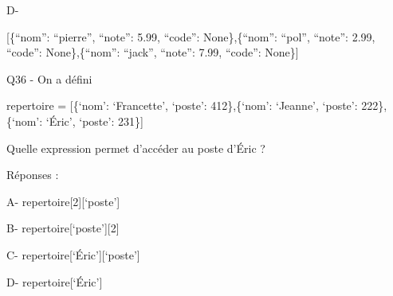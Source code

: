 \documentclass[
]{book}
\begin{document}
D-

{[}\{``nom'': ``pierre'', ``note'': 5.99, ``code'': None\},\{``nom'': ``pol'', ``note'': 2.99, ``code'': None\},\{``nom'': ``jack'', ``note'': 7.99, ``code'': None\}{]}

Q36 - On a défini

repertoire = {[}\{`nom': `Francette', `poste': 412\},\{`nom': `Jeanne', `poste': 222\},\{`nom': `Éric', `poste': 231\}{]}

Quelle expression permet d'accéder au poste d'Éric ?

Réponses :

A- repertoire{[}2{]}{[}`poste'{]}

B- repertoire{[}`poste'{]}{[}2{]}

C- repertoire{[}`Éric'{]}{[}`poste'{]}

D- repertoire{[}`Éric'{]}

  
\end{document}
